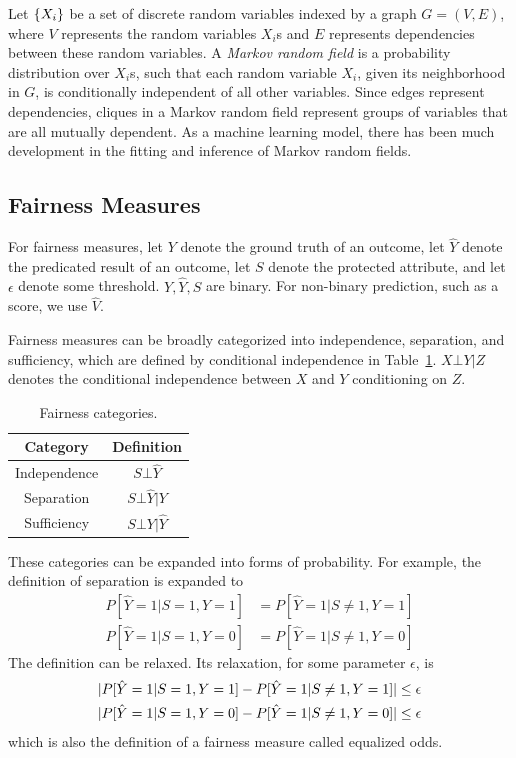 \documentclass[manuscript,screen,review,anonymous]{acmart}
\DeclarePairedDelimiter{\set}{\{}{\}}
\DeclarePairedDelimiter{\abs}{\lvert}{\rvert}
\begin{document}
Let $\set{X_i}$ be a set of discrete random variables indexed by a graph $G = (V,E)$, where $V$ represents the random variables $X_i$s and $E$ represents dependencies between these random variables. A \emph{Markov random field} is a probability distribution over $X_i$s, such that each random variable $X_i$, given its neighborhood in $G$, is conditionally independent of all other variables. Since edges represent dependencies, cliques in a Markov random field represent groups of variables that are all mutually dependent. As a machine learning model, there has been much development in the fitting and inference of Markov random fields\cite{koller2009probabilistic,murphy2023probabilistic}.

\subsection{Fairness Measures}

For fairness measures\cite{yuan2024ensuring,pessach2022review}, let $Y$ denote the ground truth of an outcome, let $\hat{Y}$ denote the predicated result of an outcome, let $S$ denote the protected attribute, and let $\epsilon$ denote some threshold. $Y, \hat{Y}, S$ are binary. For non-binary prediction, such as a score, we use $\hat{V}$.

Fairness measures can be broadly categorized into independence, separation, and sufficiency, which are defined by conditional independence in Table~\ref{tab:categories}. $X \bot Y | Z$ denotes the conditional independence between $X$ and $Y$ conditioning on $Z$.

\begin{table}[h]
\caption{Fairness categories.}
\label{tab:categories}
\begin{tabular}{cc}
\toprule
\textbf{Category} & \textbf{Definition} \\
\midrule
Independence & $S \bot \hat{Y}$ \\
Separation & $S \bot \hat{Y} | Y$ \\
Sufficiency & $S \bot Y | \hat{Y}$ \\
\bottomrule
\end{tabular}
\end{table}

These categories can be expanded into forms of probability. For example, the definition of separation is expanded to
\begin{align*}
P[\hat{Y} = 1 | S = 1, Y = 1] & = P[\hat{Y} = 1 | S \neq 1, Y = 1] \\
P[\hat{Y} = 1 | S = 1, Y = 0] & = P[\hat{Y} = 1 | S \neq 1, Y = 0]
\end{align*}
The definition can be relaxed. Its relaxation, for some parameter $\epsilon$, is
\begin{align*}
\abs{P[\hat{Y} = 1 | S = 1, Y = 1] - P[\hat{Y} = 1 | S \neq 1, Y = 1]} & \leq \epsilon \\
\abs{P[\hat{Y} = 1 | S = 1, Y = 0] - P[\hat{Y} = 1 | S \neq 1, Y = 0]} & \leq \epsilon
\end{align*}
which is also the definition of a fairness measure called equalized odds.
\end{document}
